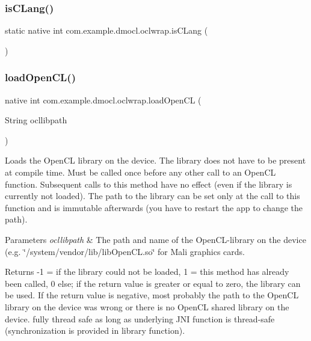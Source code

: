 \subsubsection{\texorpdfstring{is\+C\+Lang()}{isCLang()}}
{\footnotesize\ttfamily static native int com.\+example.\+dmocl.\+oclwrap.\+is\+C\+Lang (\begin{DoxyParamCaption}{ }\end{DoxyParamCaption})\hspace{0.3cm}{\ttfamily [static]}}

\mbox{\label{classcom_1_1example_1_1dmocl_1_1oclwrap_ac410aa241e771d4b1962636fa9f04e24}} 
\subsubsection{\texorpdfstring{load\+Open\+C\+L()}{loadOpenCL()}}
{\footnotesize\ttfamily native int com.\+example.\+dmocl.\+oclwrap.\+load\+Open\+CL (\begin{DoxyParamCaption}\item[{String}]{ocllibpath }\end{DoxyParamCaption})}

Loads the Open\+CL library on the device. The library does not have to be present at compile time. Must be called once before any other call to an Open\+CL function. Subsequent calls to this method have no effect (even if the library is currently not loaded). The path to the library can be set only at the call to this function and is immutable afterwards (you have to restart the app to change the path). 
\begin{DoxyParams}{Parameters}
{\em ocllibpath} & The path and name of the Open\+C\+L-\/library on the device (e.\+g. \char`\"{}/system/vendor/lib/lib\+Open\+C\+L.\+so\char`\"{} for Mali graphics cards. \\
\hline
\end{DoxyParams}
\begin{DoxyReturn}{Returns}
-\/1 = if the library could not be loaded, 1 = this method has already been called, 0 else; if the return value is greater or equal to zero, the library can be used. If the return value is negative, most probably the path to the Open\+CL library on the device was wrong or there is no Open\+CL shared library on the device.  fully thread safe as long as underlying J\+NI function is thread-\/safe (synchronization is provided in library function). 
\end{DoxyReturn}
\mbox{\label{classcom_1_1example_1_1dmocl_1_1oclwrap_aa98cb05829d56c9bdc773eeda8911d2c}} 
